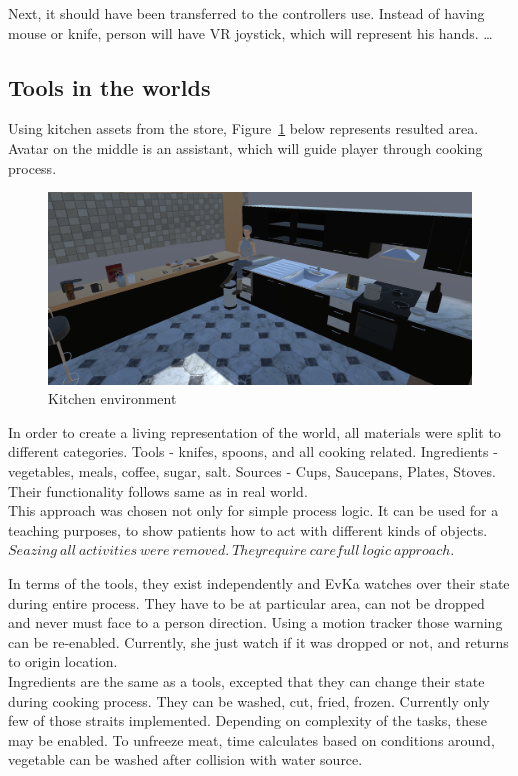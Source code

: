 \documentclass[18pt]{article}
\numberwithin{equation}{section} %
\numberwithin{figure}{section} %
\numberwithin{table}{section} %
\begin{document}
		Next, it should have been transferred to the controllers use. Instead of having mouse or knife, person will have VR joystick, which will represent his hands. \ldots \\
	
	
	
	\subsection{Tools in the worlds}
		Using kitchen assets from the store, Figure~\ref{fig:kitchen} below represents resulted area. Avatar on the middle is an assistant, which will guide player through cooking process. 
		\begin{figure}[H]
			\centering
			\includegraphics[width=0.7\linewidth]{images/kitchen}
			\caption{Kitchen environment}
			\label{fig:kitchen}
		\end{figure}
	
		In order to create a living representation of the world, all materials were split to different categories. Tools - knifes, spoons, and all cooking related. Ingredients - vegetables, meals, coffee, sugar, salt. Sources - Cups, Saucepans, Plates, Stoves. Their functionality follows same as in real world. \\
		This approach was chosen not only for simple process logic. It can be used for a teaching purposes, to show patients how to act with different kinds of objects. \\
		
		$ Seazing\ all\ activities\ were\ removed.\ They require\ carefull\ logic\ approach. $
		
		In terms of the tools, they exist independently and EvKa watches over their state during entire process. They have to be at particular area, can not be dropped and never must face to a person direction. Using a motion tracker those warning can be re-enabled. Currently, she just watch if it was dropped or not, and returns to origin location. \\
		
		Ingredients are the same as a tools, excepted that they can change their state during cooking process. They can be washed, cut, fried, frozen. Currently only few of those straits implemented. Depending on complexity of the tasks, these may be enabled. To unfreeze meat, time calculates based on conditions around, vegetable can be washed after collision with water source. \\
		
\end{document}
